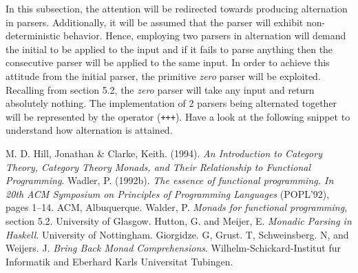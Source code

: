 \documentclass[a4paper, onecolumn]{article}
\begin{document}
    In this subsection, the attention will be redirected towards producing alternation in parsers. Additionally, it will be assumed that the parser will exhibit non-deterministic behavior. Hence, employing two parsers in alternation will demand the initial to be applied to the input and if it fails to parse anything then the consecutive parser will be applied to the same input. In order to achieve this attitude from the initial parser, the primitive \textit{zero} parser will be exploited. Recalling from section 5.2, the \textit{zero} parser will take any input and return absolutely nothing. The implementation of 2 parsers being alternated together will be represented by the operator (\texttt{+++}). Have a look at the following snippet to understand how alternation is attained.
    \begin{thebibliography}{9}
    M. D. Hill, Jonathan & Clarke, Keith. (1994). \textit{An Introduction to Category Theory, Category Theory Monads, and Their Relationship to Functional Programming}.
    Wadler, P. (1992b). \textit{The essence of functional programming. In
    20th ACM Symposium on Principles of Programming Languages}
    (POPL’92), pages 1–14. ACM, Albuquerque.
    Walder, P. \textit{Monads for functional programming}, section 5.2. University of Glasgow. 
    Hutton, G. and Meijer, E. \textit{Monadic Parsing in Haskell}. University of Nottingham.
    Giorgidze. G, Grust. T, Schweinsberg. N, and Weijers. J. \textit{Bring Back Monad Comprehensions}. Wilhelm-Schickard-Institut fur Informatik and Eberhard Karls Universitat Tubingen.
    \end{thebibliography}
    
\end{document}
